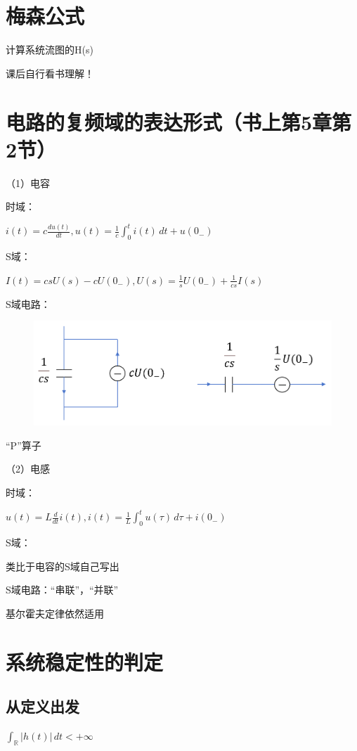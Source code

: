 \documentclass[UTF8]{ctexart}
\begin{document}
\section{梅森公式}
计算系统流图的H(s)\par
课后自行看书理解！\par

\section{电路的复频域的表达形式（书上第5章第2节）}
（1）电容\par
时域：\par
\qquad $i(t)=c\frac{du(t)}{dt},u(t)=\frac{1}{c}\int_{0}^{t} i(t) \,dt +u(0_-)  $\par
S域：\par
\qquad $I(t)=csU(s)-cU(0_-),U(s)=\frac{1}{s} U(0_-)+\frac{1}{cs} I(s) $\par
S域电路：\par
\qquad \par
\begin{figure}[h]
    \centering         %
    \includegraphics[scale=0.35]{8.png}
\end{figure}
“P”算子 \par
（2）电感\par
时域：\par
\qquad $u(t)=L\frac{d}{dt}i(t),i(t)=\frac{1}{L}\int_{0}^{t} u(\tau ) \,d\tau +i(0_-)   $\par
S域：\par
类比于电容的S域自己写出\par
S域电路：“串联”，“并联”\par
基尔霍夫定律依然适用\par

\section{系统稳定性的判定}
\subsection{从定义出发}
\qquad $\int_{\mathbb{R} } |h(t) \vert  \,dt <+\infty $\par
\end{document}
